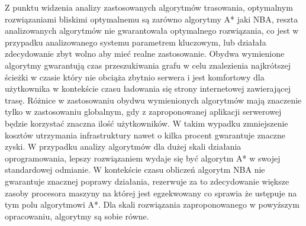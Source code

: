 Z punktu widzenia analizy zastosowanych algorytmów trasowania, optymalnym rozwiązaniami bliskimi optymalnemu są zarówno algorytmy A* jaki NBA, reszta analizowanych algorytmów nie gwarantowała optymalnego rozwiązania, co jest w przypadku analizowanego systemu parametrem kluczowym, lub działała zdecydowanie zbyt wolno aby mieć realne zastosowanie. Obydwa wymienione algorytmy gwarantują czas przeszukiwania grafu w celu znalezienia najkrótszej ścieżki w czasie który nie obciąża zbytnio serwera i jest komfortowy dla użytkownika w kontekście czasu ładowania się strony internetowej zawierającej trasę. Różnice w zastosowaniu obydwu wymienionych algorytmów mają znaczenie tylko w zastosowaniu globalnym, gdy z zaproponowanej aplikacji serwerowej będzie korzystać znaczna ilość użytkowników. W takim wypadku zmniejszenie kosztów utrzymania infrastruktury nawet o kilka procent gwarantuje znaczne zyski. W przypadku analizy algorytmów dla dużej skali działania oprogramowania, lepszy rozwiązaniem wydaje się być algorytm A* w swojej standardowej odmianie. W kontekście czasu obliczeń algorytm NBA nie gwarantuje znacznej poprawy działania, rezerwuje za to zdecydowanie większe zasoby procesora maszyny na której jest egzekwowany co sprawia że ustępuje na tym polu algorytmowi A*. Dla skali rozwiązania zaproponowanego w powyższym opracowaniu, algorytmy są sobie równe.
